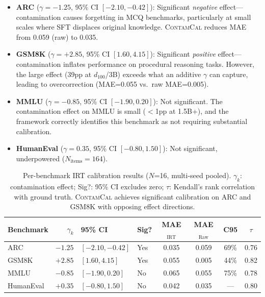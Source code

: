 \documentclass[11pt,a4paper]{article}
\newcommand{\contamcal}{\textsc{ContamCal}}
\begin{document}
\begin{itemize}
\item \textbf{ARC} ($\gamma=-1.25$, 95\% CI $[-2.10, -0.42]$): Significant \emph{negative} effect---contamination causes forgetting in MCQ benchmarks, particularly at small scales where SFT displaces original knowledge. \contamcal{} reduces MAE from 0.059 (raw) to 0.035.

\item \textbf{GSM8K} ($\gamma=+2.85$, 95\% CI $[1.60, 4.15]$): Significant \emph{positive} effect---contamination inflates performance on procedural reasoning tasks. However, the large effect (39pp at $d_{100}$/3B) exceeds what an additive $\gamma$ can capture, leading to overcorrection (MAE=0.055 vs.\ raw MAE=0.005).

\item \textbf{MMLU} ($\gamma=-0.85$, 95\% CI $[-1.90, 0.20]$): Not significant. The contamination effect on MMLU is small ($<$1pp at 1.5B+), and the framework correctly identifies this benchmark as not requiring substantial calibration.

\item \textbf{HumanEval} ($\gamma=0.35$, 95\% CI $[-0.80, 1.50]$): Not significant, underpowered ($N_\text{items}=164$).
\end{itemize}

\begin{table}[t]
\centering
\caption{Per-benchmark IRT calibration results ($N$=16, multi-seed pooled). $\gamma_k$: contamination effect; Sig?: 95\% CI excludes zero; $\tau$: Kendall's rank correlation with ground truth. \contamcal{} achieves significant calibration on ARC and GSM8K with opposing effect directions.}
\label{tab:irt_results}
\small
\begin{tabular}{lrllcccc}
\toprule
Benchmark & $\gamma_k$ & 95\% CI & Sig? & MAE$_{\text{IRT}}$ & MAE$_{\text{Raw}}$ & C95 & $\tau$ \\
\midrule
ARC       & $-1.25$ & $[-2.10,-0.42]$ & Yes & 0.035 & 0.059 & 69\% & 0.76 \\
GSM8K     & $+2.85$ & $[1.60,4.15]$   & Yes & 0.055 & 0.005 & 44\% & 0.82 \\
MMLU      & $-0.85$ & $[-1.90,0.20]$  & No  & 0.065 & 0.055 & 75\% & 0.78 \\
HumanEval & $+0.35$ & $[-0.80,1.50]$  & No  & 0.042 & 0.035 & ---  & 0.80 \\
\bottomrule
\end{tabular}
\end{table}
\end{document}
